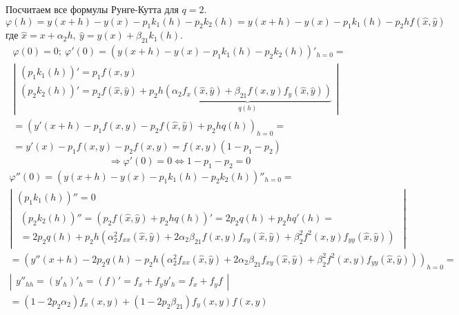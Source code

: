 \begin{example}
  Посчитаем все формулы Рунге-Кутта для $q=2$.
  \[\varphi(h)=y(x+h)-y(x)-p_1k_1(h)-p_2k_2(h)=y(x+h)-y(x)-p_1k_1(h)-p_2hf(\hat{x}, \hat{y})\]
  где $\hat{x}=x+\alpha_2h,\ \hat{y}=y(x)+\beta_{21}k_1(h)$.
  \begin{multline*}
    \varphi(0)=0;\ \varphi'(0)=\left(y(x+h)-y(x)-p_1k_1(h)-p_2k_2(h)\right)'_{h=0}= \\
    \left|\begin{array}{c}
      (p_1k_1(h))'=p_1f(x,y) \\
      (p_2k_2(h))'=p_2f(\hat{x}, \hat{y})+p_2h\underbrace{(\alpha_2f_x(\hat{x}, \hat{y})+\beta_{21}f(x,y)f_y(\hat{x}, \hat{y}))}_{q(h)}
    \end{array}\right|\\
    =\left(y'(x+h)-p_1f(x,y)-p_2f(\hat{x}, \hat{y})+p_2hq(h)\right)_{h=0}= \\
    =y'(x)-p_1f(x,y)-p_2f(x, y)=f(x, y)(1-p_1-p_2)
  \end{multline*}
  \begin{equation}\label{eq:runge:first_deriv}
    \Rightarrow\varphi'(0)=0\Leftrightarrow1-p_1-p_2=0
  \end{equation}
  \begin{multline*}
    \varphi''(0)=\left(y(x+h)-y(x)-p_1k_1(h)-p_2k_2(h)\right)''_{h=0}= \\
    \left|\begin{array}{c}
      (p_1k_1(h))''=0 \\
      \begin{array}{c}
        (p_2k_2(h))''=(p_2f(\hat{x}, \hat{y})+p_2hq(h))'=2p_2q(h)+p_2hq'(h) = \\
        =2p_2q(h)+p_2h(\alpha_2^2f_{xx}(\hat{x},\hat{y})+2\alpha_2\beta_{21}f(x,y)f_{xy}(\hat{x},\hat{y})+\beta_2^2f^2(x,y)f_{yy}(\hat{x},\hat{y}))
      \end{array}
    \end{array}\right| \\
    =\left(y''(x+h)-2p_2q(h)-p_2h(\alpha_2^2f_{xx}(\hat{x},\hat{y})+2\alpha_2\beta_{21}f_{xy}(\hat{x},\hat{y})+\beta_2^2f^2(x,y)f_{yy}(\hat{x},\hat{y}))\right)_{h=0}= \\
    \left|\begin{array}{c}y''_{hh}=(y'_h)'_h=(f)'=f_x+f_yy'_h=f_x+f_yf\end{array}\right| \\
    =(1-2p_2\alpha_2)f_x(x,y)+(1-2p_2\beta_{21})f_y(x,y)f(x,y)
  \end{multline*}
  \begin{equation}\label{eq:runge:second_deriv}

\end{equation}
\end{example}

